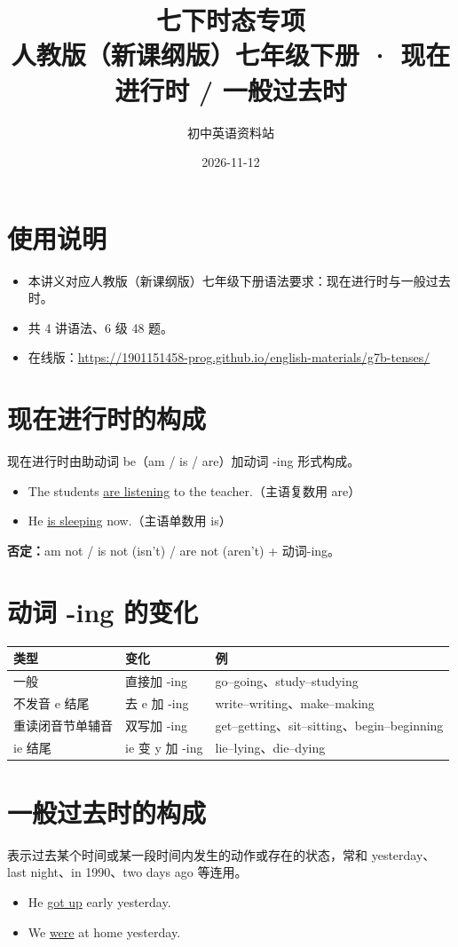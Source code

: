 \documentclass[11pt,a4paper]{ctexart}
\title{\textbf{七下时态专项}\\[4pt]
\large 人教版（新课纲版）七年级下册 · 现在进行时 / 一般过去时}
\author{初中英语资料站}
\date{2026-11-12}
\begin{document}
\maketitle

\section*{使用说明}
\begin{itemize}[leftmargin=1.4em]
\item 本讲义对应人教版（新课纲版）七年级下册语法要求：现在进行时与一般过去时。
\item 共 4 讲语法、6 级 48 题。
\item 在线版：\url{https://1901151458-prog.github.io/english-materials/g7b-tenses/}
\end{itemize}

\section{现在进行时的构成}
现在进行时由助动词 be（am / is / are）加动词 -ing 形式构成。
\begin{itemize}[leftmargin=1.4em]
\item The students \underline{are listening} to the teacher.（主语复数用 are）
\item He \underline{is sleeping} now.（主语单数用 is）
\end{itemize}
\textbf{否定：}am not / is not (isn't) / are not (aren't) + 动词-ing。

\section{动词 -ing 的变化}
\begin{center}
\begin{tabular}{p{4.8cm}p{3.4cm}p{6.0cm}}
\hline
\textbf{类型} & \textbf{变化} & \textbf{例}\\
\hline
一般 & 直接加 -ing & go--going、study--studying\\
不发音 e 结尾 & 去 e 加 -ing & write--writing、make--making\\
重读闭音节单辅音 & 双写加 -ing & get--getting、sit--sitting、begin--beginning\\
ie 结尾 & ie 变 y 加 -ing & lie--lying、die--dying\\
\hline
\end{tabular}
\end{center}

\section{一般过去时的构成}
表示过去某个时间或某一段时间内发生的动作或存在的状态，常和 yesterday、last night、in 1990、two days ago 等连用。
\begin{itemize}[leftmargin=1.4em]
\item He \underline{got up} early yesterday.
\item We \underline{were} at home yesterday.
\end{itemize}
\end{document}

